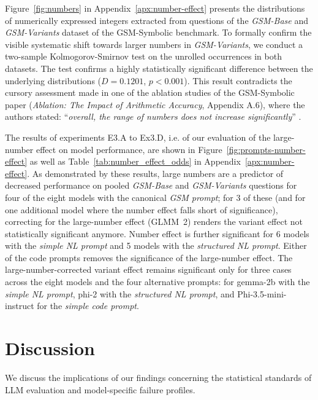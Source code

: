 \documentclass[11pt]{article}
\begin{document}
Figure~\ref{fig:numbers} in Appendix~\ref{apx:number-effect} presents the distributions of numerically expressed integers extracted from questions of the \textit{GSM-Base} and \textit{GSM-Variants} dataset of the GSM-Symbolic benchmark. To formally confirm the visible systematic shift towards larger numbers in \textit{GSM-Variants}, we conduct a two-sample Kolmogorov-Smirnov test on the unrolled occurrences in both datasets. The test confirms a highly statistically significant difference between the underlying distributions ($D = 0.1201$, $p < 0.001$). This result contradicts the cursory assessment made in one of the ablation studies of the GSM-Symbolic paper (\textit{Ablation: The Impact of Arithmetic Accuracy}, Appendix A.6), where the authors stated: ``\textit{overall, the range of numbers does not increase significantly}'' \citep{mirzadeh2025gsm}.

The results of experiments E3.A to Ex3.D, i.e. of our evaluation of the large-number effect on model performance, are shown in Figure~\ref{fig:prompts-number-effect} as well as Table~\ref{tab:number_effect_odds} in Appendix~\ref{apx:number-effect}. As demonstrated by these results, large numbers are a predictor of decreased performance on pooled \textit{GSM-Base} and \textit{GSM-Variants} questions for four of the eight models with the canonical \textit{GSM prompt}; for 3 of these (and for one additional model where the number effect falls short of significance), correcting for the large-number effect (GLMM~2) renders the variant effect not statistically significant anymore. Number effect is further significant for 6 models with the \textit{simple NL prompt} and 5 models with the \textit{structured NL prompt}.
Either of the code prompts removes the significance of the large-number effect. The large-number-corrected variant effect remains significant only for three cases across the eight models and the four alternative prompts: for gemma-2b with the \textit{simple NL prompt}, phi-2 with the \textit{structured NL prompt}, and Phi-3.5-mini-instruct for the \textit{simple code prompt}.

\section{Discussion}
We discuss the implications of our findings concerning the statistical standards of LLM evaluation and model-specific failure profiles.
\end{document}
